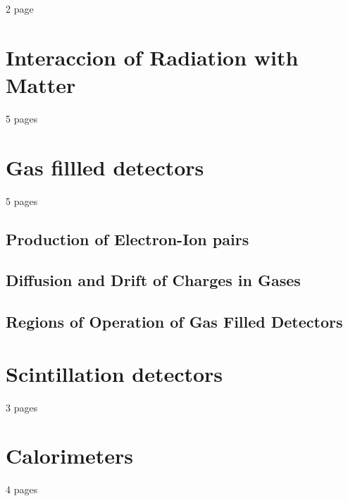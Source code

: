 2 page
\section{Interaccion of Radiation with Matter}
5 pages
\section{Gas fillled detectors}
5 pages
\subsection{Production of Electron-Ion pairs}
\subsection{Diffusion and Drift of Charges in Gases}
\subsection{Regions of Operation of Gas Filled Detectors}
\section{Scintillation detectors}
3 pages
\section{Calorimeters}
4 pages




